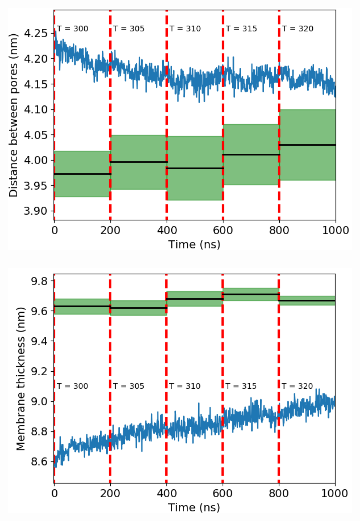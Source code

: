 \documentclass{article}
\begin{document}
  \begin{figure}
	\centering
	\begin{subfigure}{0.325\textwidth}
		\centering
		\includegraphics[width=\textwidth]{p2p_layered.png}
		\caption{}\label{fig:p2p_layered}
	\end{subfigure}
	\begin{subfigure}{0.325\textwidth}
		\centering
		\includegraphics[width=\textwidth]{thickness_layered.png}
		\caption{}\label{fig:thickness_layered}
	\end{subfigure}
	\begin{subfigure}{0.325\textwidth}
		\centering

\end{subfigure}
\end{figure}
\end{document}
